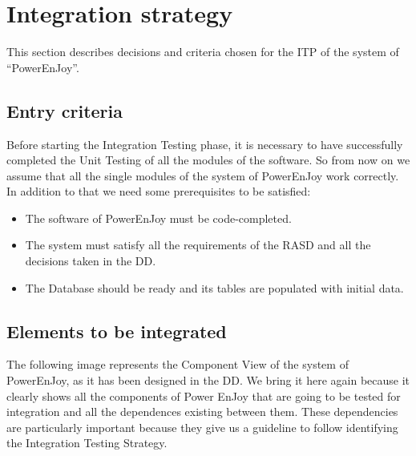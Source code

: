 \chapter{Integration strategy}
This section describes decisions and criteria chosen for the ITP of the system of “PowerEnJoy”.

\section{Entry criteria}
Before starting the Integration Testing phase, it is necessary to have successfully completed the Unit Testing of all the modules of the software.
So from now on we assume that all the single modules of the system of PowerEnJoy work correctly.
In addition to that we need some prerequisites to be satisfied:
\begin{itemize}
\item The software of PowerEnJoy must be code-completed.
\item The system must satisfy all the requirements of the RASD and all the decisions taken in the DD.
\item The Database should be ready and its tables are populated with initial data.
\end{itemize}

\section{Elements to be integrated}
The following image represents the Component View of the system of PowerEnJoy, as it has been designed in the DD.
We bring it here again because it clearly shows all the components of Power EnJoy that are going to be tested for integration and all the dependences existing between them.
These dependencies are particularly important because they give us a guideline to follow identifying the Integration Testing Strategy.

